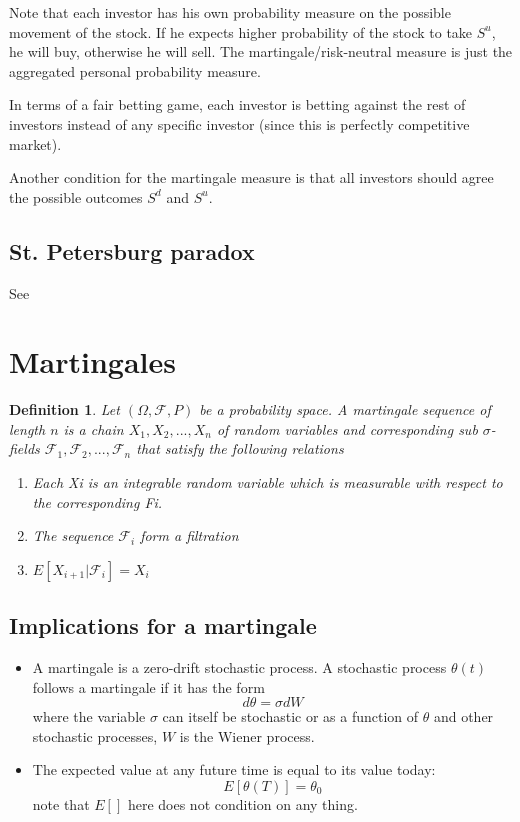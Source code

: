 \documentclass[a4paper,13pt]{report}
\newcommand{\cF}{\mathcal{F}}
\newtheorem*{definition}{Definition}
\begin{document}
Note that each investor has his own probability measure on the possible movement of the stock. If he expects higher probability of the stock to take $S^u$, he will buy, otherwise he will sell. The martingale/risk-neutral measure is just the aggregated personal probability measure. 

In terms of a fair betting game, each investor is betting against the rest of investors instead of any specific investor (since this is perfectly competitive market).


Another condition for the martingale measure is that all investors should agree the possible outcomes $S^d$ and $S^u$. 




\subsection{St. Petersburg paradox}
See \cite{wiki:Petersburgparadox}


\section{Martingales}

\begin{definition}
Let $(\Omega, \cF, P)$ be a probability space. A martingale sequence of length $n$ is a chain $X_1, X_2,..., X_n$ of random variables and corresponding sub $\sigma$-fields $\cF_1, \cF_2, ... , \cF_n $ that satisfy the following relations
\begin{enumerate}
    \item Each Xi is an integrable random variable which is measurable with respect to the corresponding Fi.
    \item The sequence $\cF_i$ form a filtration
    \item $E[X_{i+1}|\cF_i]=X_i$
\end{enumerate}
\end{definition}

\subsection{Implications for a martingale}
\begin{itemize}
    \item A martingale is a zero-drift stochastic process. A stochastic process $\theta(t)$ follows a martingale if it has the form
    $$d\theta = \sigma dW$$
    where the variable $\sigma$ can itself be stochastic or as a function of $\theta$ and other stochastic processes, $W$ is the Wiener process.
    \item The expected value at any future time is equal to its value today:
    $$E[\theta(T)] = \theta_0$$
    note that $E[]$ here does not condition on any thing. 
\end{itemize}
\end{document}
